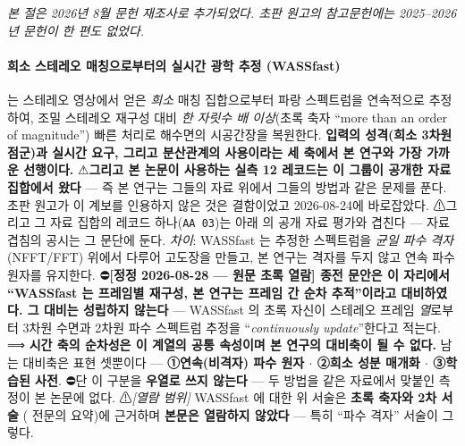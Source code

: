 \documentclass[11pt]{report}
\numberwithin{equation}{chapter}
\numberwithin{figure}{chapter}
\numberwithin{table}{chapter}
\begin{document}
\emph{본 절은 2026년 8월 문헌 재조사로 추가되었다. 초판 원고의 참고문헌에는 2025--2026년
문헌이 한 편도 없었다.}

\paragraph{희소 스테레오 매칭으로부터의 실시간 광학 추정 (WASSfast)}
\citet{Bergamasco2021WASSfast}는 스테레오 영상에서 얻은 \emph{희소} 매칭 집합으로부터
파랑 스펙트럼을 연속적으로 추정하여, 조밀 스테레오 재구성 대비
\emph{한 자릿수 배 이상}(초록 축자 ``more than an order of magnitude'') 빠른 처리로
해수면의 시공간장을 복원한다. \textbf{입력의 성격(희소 3차원 점군)과 실시간 요구, 그리고
분산관계의 사용이라는 세 축에서 본 연구와 가장 가까운 선행이다.}
⚠\textbf{그리고 본 논문이 사용하는 실측 12 레코드는 이 그룹이 공개한 자료
집합}\citep{Guimaraes2020Dataset}\textbf{에서 왔다} --- 즉 본 연구는 그들의 자료 위에서
그들의 방법과 같은 문제를 푼다. 초판 원고가 이 계보를 인용하지 않은 것은 결함이었고
2026-08-24에 바로잡았다.
⚠그리고 그 자료 집합의 레코드 하나(\texttt{AA 03})는 아래 \citet{Wang2025PointsToWaves} 의
공개 자료 평가와 겹친다 --- 자료 겹침의 공시는 그 문단에 둔다.
\emph{차이}: WASSfast 는 추정한 스펙트럼을 \emph{균일 파수 격자}(NFFT/FFT) 위에서 다루어
고도장을 만들고, 본 연구는 격자를 두지 않고 연속 파수 원자를 유지한다.
⛔\textbf{[정정 2026-08-28 --- 원문 초록 열람] 종전 문안은 이 자리에서 ``WASSfast 는
프레임별 재구성, 본 연구는 프레임 간 순차 추적''이라고 대비하였다. 그 대비는 성립하지
않는다} --- WASSfast 의 초록 자신이 스테레오 프레임 \emph{열}로부터 3차원 수면과 2차원
파수 스펙트럼 추정을 ``\emph{continuously update}''한다고 적는다.
⟹ \textbf{시간 축의 순차성은 이 계열의 공통 속성이며 본 연구의 대비축이 될 수 없다.}
남는 대비축은 표현 셋뿐이다 --- \textbf{①연속(비격자) 파수 원자 $\cdot$ ②희소 성분
매개화 $\cdot$ ③학습된 사전}. ⛔단 이 구분을 \textbf{우열로 쓰지 않는다} ---
두 방법을 같은 자료에서 맞붙인 측정이 본 논문에 없다.
⚠\emph{[열람 범위]} WASSfast 에 대한 위 서술은 \textbf{초록 축자와 2차 서술}
(\citet{Wang2025PointsToWaves} 전문의 요약)에 근거하며 \textbf{본문은 열람하지 않았다} ---
특히 ``파수 격자'' 서술이 그렇다.
\end{document}
